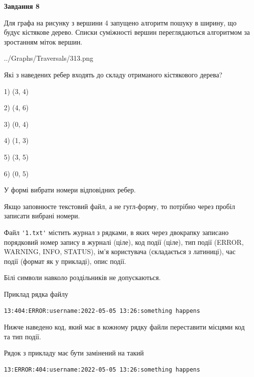 \documentclass[12pt, ukrainian]{article}
\def\code#1{\Verb!#1!}
\begin{document}
{\begin {large}
{\begin {center}\textbf{Завдання 8}\end {center}}\par
Для графа на рисунку з вершини 4 запущено алгоритм пошуку в ширину, що будує кістякове дерево. Списки суміжності вершин переглядаються алгоритмом за зростанням міток вершин.\par
\begin{center}
	{../Graphs/Traversals/313.png}
\end{center}
\par Які з наведених ребер входять до складу отриманого кістякового дерева?\par
1) (3, 4)\par
2) (4, 6)\par
3) (0, 4)\par
4) (1, 3)\par
5) (3, 5)\par
6) (0, 5)\par
{\vskip 15pt} У формі вибрати номери відповідних ребер.


Якщо заповнюєте текстовий файл, а не гугл-форму, то потрібно через пробіл записа\-ти вибрані номери.\par
\newpage


Файл \code{'1.txt'} містить журнал з рядками, в яких через двокрапку записано поряд\-ко\-вий номер запису в журналі (ціле), код події (ціле), тип події (ERROR,\\ WARNING, INFO, STATUS), ім'я користувача (складається з латиниці), час події (фор\-мат як у прикладі), опис події.

Білі символи навколо роздільників не допускаються.

Приклад рядка файлу



\begin{verbatim}
13:404:ERROR:username:2022-05-05 13:26:something happens
\end{verbatim}


Нижче наведено код, який має в кожному рядку файли переставити місцями код та тип події.

Рядок з прикладу має бути замінений на такий



\begin{verbatim}
13:ERROR:404:username:2022-05-05 13:26:something happens
\end{verbatim}





\end{large}}
\end{document}
